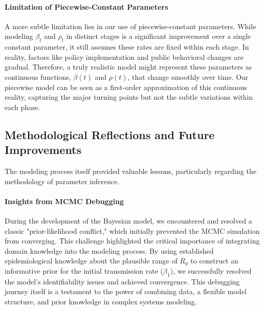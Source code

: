 \documentclass[12pt, a4paper]{article}
\begin{document}
\paragraph{Limitation of Piecewise-Constant Parameters} A more subtle limitation lies in our use of piecewise-constant parameters. While modeling $\beta_t$ and $\rho_t$ in distinct stages is a significant improvement over a single constant parameter, it still assumes these rates are fixed within each stage. In reality, factors like policy implementation and public behavioral changes are gradual. Therefore, a truly realistic model might represent these parameters as continuous functions, $\beta(t)$ and $\rho(t)$, that change smoothly over time. Our piecewise model can be seen as a first-order approximation of this continuous reality, capturing the major turning points but not the subtle variations within each phase.

\subsection{Methodological Reflections and Future Improvements}
The modeling process itself provided valuable lessons, particularly regarding the methodology of parameter inference.

\paragraph{Insights from MCMC Debugging} During the development of the Bayesian model, we encountered and resolved a classic "prior-likelihood conflict," which initially prevented the MCMC simulation from converging. This challenge highlighted the critical importance of integrating domain knowledge into the modeling process. By using established epidemiological knowledge about the plausible range of $R_0$ to construct an informative prior for the initial transmission rate ($\beta_1$), we successfully resolved the model's identifiability issues and achieved convergence. This debugging journey itself is a testament to the power of combining data, a flexible model structure, and prior knowledge in complex systems modeling.
\end{document}
